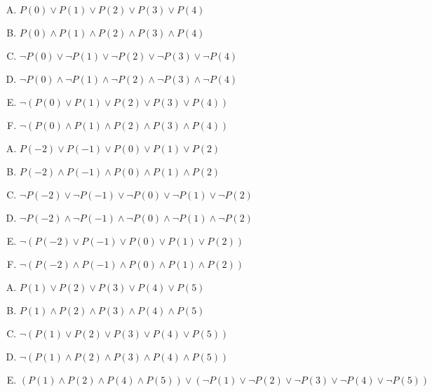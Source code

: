 {{        %
        \begin{practices}
            \begin{enumerate}[A.]
                \item $P(0) \vee P(1) \vee P(2) \vee P(3) \vee P(4)$
                \item $P(0) \wedge P(1) \wedge P(2) \wedge P(3) \wedge P(4)$
                \item $\neg P(0) \vee \neg P(1) \vee \neg P(2) \vee \neg P(3) \vee \neg P(4)$
                \item $\neg P(0) \wedge \neg P(1) \wedge \neg P(2) \wedge \neg P(3) \wedge \neg P(4)$
                \item $\neg (P(0) \vee P(1) \vee P(2) \vee P(3) \vee P(4))$
                \item $\neg (P(0) \wedge P(1) \wedge P(2) \wedge P(3) \wedge P(4))$
            \end{enumerate}
        \end{practices}

        \begin{practices}
            \begin{enumerate}[A.]
                \item $P(-2) \vee P(-1) \vee P(0) \vee P(1) \vee P(2)$
                \item $P(-2) \wedge P(-1) \wedge P(0) \wedge P(1) \wedge P(2)$
                \item $\neg P(-2) \vee \neg P(-1) \vee \neg P(0) \vee \neg P(1) \vee \neg P(2)$
                \item $\neg P(-2) \wedge \neg P(-1) \wedge \neg P(0) \wedge \neg P(1) \wedge \neg P(2)$
                \item $\neg (P(-2) \vee P(-1) \vee P(0) \vee P(1) \vee P(2))$
                \item $\neg (P(-2) \wedge P(-1) \wedge P(0) \wedge P(1) \wedge P(2))$
            \end{enumerate}
        \end{practices}

        \begin{practices}
            \begin{enumerate}[A.]
                \item $P(1) \vee P(2) \vee P(3) \vee P(4) \vee P(5)$
                \item $P(1) \wedge P(2) \wedge P(3) \wedge P(4) \wedge P(5)$
                \item $\neg (P(1) \vee P(2) \vee P(3) \vee P(4) \vee P(5))$
                \item $\neg (P(1) \wedge P(2) \wedge P(3) \wedge P(4) \wedge P(5))$
                \item $(P(1) \wedge P(2) \wedge P(4) \wedge P(5)) \vee (\neg P(1) \vee \neg P(2) \vee \neg P(3) \vee \neg P(4) \vee \neg P(5))$
            \end{enumerate}
        \end{practices}

}}
